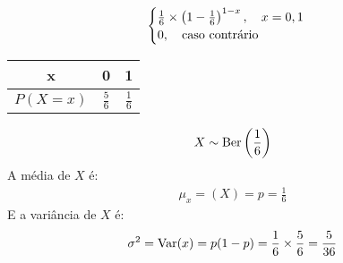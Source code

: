 \begin{description}
\begin{example}
\begin{align}
\begin{cases}
       \frac{1}{6} \times \left(1-\frac{1}{6}\right)^{1-x}, \text{\quad}x=0,1\\
       0, \text{\quad caso contrário}
     \end{cases}
   \end{align}
   \begin{center}
     \begin{tabular}{c c c}
       \toprule
       x&0&1\\ \midrule
       $P(X=x)$&$\frac{5}{6}$&$\frac{1}{6}$\\ \bottomrule
     \end{tabular}
   \end{center}
   \begin{align*}
     X \sim \operatorname{Ber}\left(\frac{1}{6}\right)
   \end{align*}
   A média de $X$ é: 
   \begin{align*}
     \mu_{x}=(X)=p=\frac{1}{6}
   \end{align*}
   E a variância de $X$ é: 
   \begin{align*}
     \sigma^2= \operatorname{Var}(x)=p(1-p)=\frac{1}{6} \times \frac{5}{6}=\frac{5}{36}
   \end{align*}
\end{example}
\end{description}

